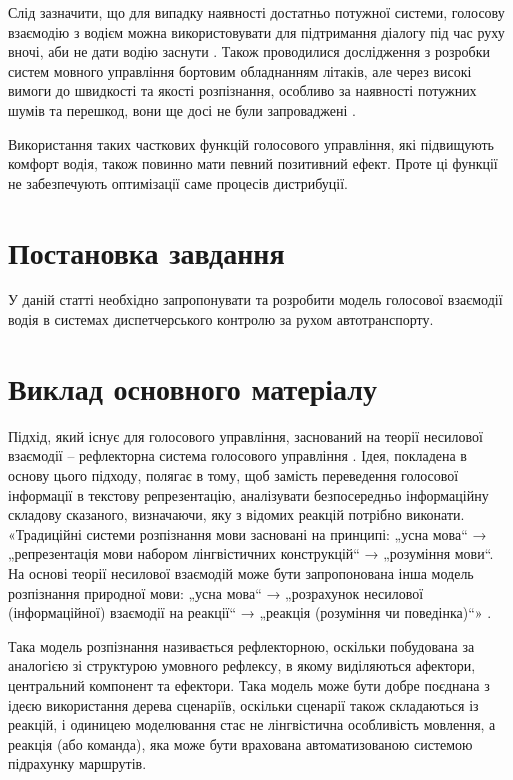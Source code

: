 Слід зазначити, що для випадку наявності достатньо потужної системи, голосову взаємодію з водієм можна використовувати для підтримання діалогу під час руху вночі, аби не дати водію заснути \cite{Kravchenko_2012}.
Також проводилися дослідження з розробки систем мовного управління бортовим обладнанням літаків, але через високі вимоги до швидкості та якості розпізнання, особливо за наявності потужних шумів та перешкод, вони ще досі не були запроваджені \cite{Korsun_2013}.

Використання таких часткових функцій голосового управління, які підвищують комфорт водія, також повинно мати певний позитивний ефект. Проте ці функції не забезпечують оптимізації саме процесів дистрибуції.


\section{Постановка завдання}

У даній статті необхідно запропонувати та розробити модель голосової взаємодії водія в системах диспетчерського контролю за рухом автотранспорту.

\section{Виклад основного матеріалу}

Підхід, який існує для голосового управління, заснований на теорії несилової взаємодії \cite{Teslia_2010} – рефлекторна система голосового управління \cite{Egorchenkov_2016,Teslia_2013}. Ідея, покладена в основу цього підходу, полягає в тому, щоб замість переведення голосової інформації в текстову репрезентацію, аналізувати безпосередньо інформаційну складову сказаного, визначаючи, яку з відомих реакцій потрібно виконати. «Традиційні системи розпізнання мови засновані на принципі: „усна мова“ → „репрезентація мови набором лінгвістичних конструкцій“ → „розуміння мови“. На основі теорії несилової взаємодій може бути запропонована інша модель розпізнання природної мови: „усна мова“ → „розрахунок несилової (інформаційної) взаємодії на реакції“ → „реакція (розуміння чи поведінка)“» \cite{Teslia_2014}.

Така модель розпізнання називається рефлекторною, оскільки побудована за аналогією зі структурою умовного рефлексу, в якому виділяються афектори, центральний компонент та ефектори. Така модель може бути добре поєднана з ідеєю використання дерева сценаріїв, оскільки сценарії також складаються із реакцій, і одиницею моделювання стає не лінгвістична особливість мовлення, а реакція (або команда), яка може бути врахована автоматизованою системою підрахунку маршрутів.

